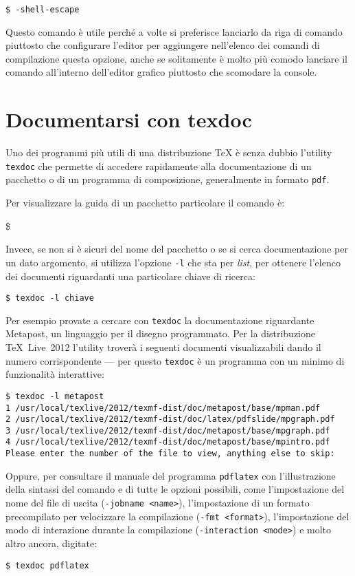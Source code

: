 \medskip
\texttt{\$  -shell-escape }
\medskip

Questo comando è utile perché a volte si preferisce lanciarlo da riga di comando
piuttosto che configurare l'editor per aggiungere nell'elenco dei comandi di
compilazione questa opzione, anche se solitamente è molto più comodo lanciare il
comando all'interno dell'editor grafico piuttosto che scomodare la console.

\section{Documentarsi con \textsf{texdoc}}

Uno dei programmi più utili di una distribuzione \TeX{} è senza dubbio l'utility
\texttt{texdoc} che permette di accedere rapidamente alla documentazione di un
pacchetto o di un programma di composizione, generalmente in formato
\texttt{pdf}.

Per visualizzare la guida di un pacchetto particolare il comando è:
\begin{tcolorbox}
\ttfamily
\$  
\end{tcolorbox}

Invece, se non si è sicuri del nome del pacchetto o se si cerca documentazione
per un dato argomento, si utilizza l'opzione \texttt{-l} che sta per
\emph{list}, per ottenere l'elenco dei documenti riguardanti una particolare
chiave di ricerca:
\begin{verbatim}
$ texdoc -l chiave
\end{verbatim}

Per esempio provate a cercare con \texttt{texdoc} la documentazione riguardante
Metapost, un linguaggio per il disegno programmato. Per la distribuzione
\TeX{}~Live~2012 l'utility troverà i seguenti documenti visualizzabili dando il
numero corrispondente --- per questo \texttt{texdoc} è un programma con un
minimo di funzionalità interattive:
\begin{Verbatim}[fontsize=\small]
$ texdoc -l metapost
1 /usr/local/texlive/2012/texmf-dist/doc/metapost/base/mpman.pdf
2 /usr/local/texlive/2012/texmf-dist/doc/latex/pdfslide/mpgraph.pdf
3 /usr/local/texlive/2012/texmf-dist/doc/metapost/base/mpgraph.pdf
4 /usr/local/texlive/2012/texmf-dist/doc/metapost/base/mpintro.pdf
Please enter the number of the file to view, anything else to skip:
\end{Verbatim}

Oppure, per consultare il manuale del programma \texttt{pdflatex} con
l'illustrazione della sintassi del comando e di tutte le opzioni possibili, come
l'impostazione del nome del file di uscita (\texttt{-jobname <name>}),
l'impostazione di un formato precompilato per velocizzare la compilazione
(\texttt{-fmt <format>}), l'impostazione del modo di interazione durante la
compilazione (\texttt{-interaction <mode>}) e molto altro ancora, digitate:
\begin{verbatim}
$ texdoc pdflatex
\end{verbatim}

